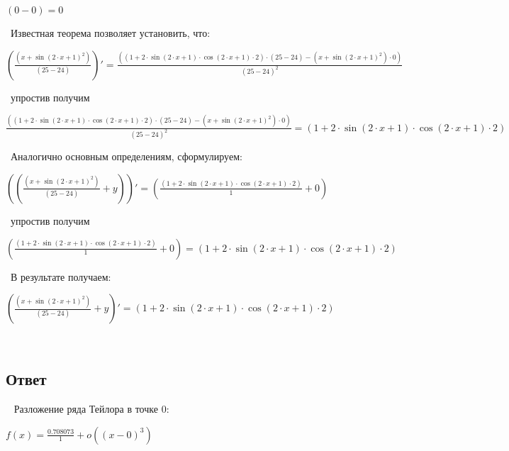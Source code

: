 \documentclass[a4paper,14pt]{extarticle}
\begin{document}
\begin{center}$(0-0) = 0$\end{center}\ 
Известная теорема позволяет установить, что: \\ 

\begin{center}$(\frac{(x+\sin  (2\cdot x+1)^{2})}{(25-24)})' = \frac{((1+2\cdot \sin  (2\cdot x+1)\cdot \cos  (2\cdot x+1)\cdot 2)\cdot (25-24)-(x+\sin  (2\cdot x+1)^{2})\cdot 0)}{(25-24)^{2}}$\end{center}\ 
упростив получим 

\begin{center}$\frac{((1+2\cdot \sin  (2\cdot x+1)\cdot \cos  (2\cdot x+1)\cdot 2)\cdot (25-24)-(x+\sin  (2\cdot x+1)^{2})\cdot 0)}{(25-24)^{2}} = (1+2\cdot \sin  (2\cdot x+1)\cdot \cos  (2\cdot x+1)\cdot 2)$\end{center}\ 
Аналогично основным определениям, сформулируем: \\ 

\begin{center}$((\frac{(x+\sin  (2\cdot x+1)^{2})}{(25-24)}+y))' = (\frac{(1+2\cdot \sin  (2\cdot x+1)\cdot \cos  (2\cdot x+1)\cdot 2)}{1}+0)$\end{center}\ 
упростив получим 

\begin{center}$(\frac{(1+2\cdot \sin  (2\cdot x+1)\cdot \cos  (2\cdot x+1)\cdot 2)}{1}+0) = (1+2\cdot \sin  (2\cdot x+1)\cdot \cos  (2\cdot x+1)\cdot 2)$\end{center}\ 
В результате получаем: \
\begin{center}$ (\frac{(x+\sin  (2\cdot x+1)^{2})}{(25-24)}+y)' = (1+2\cdot \sin  (2\cdot x+1)\cdot \cos  (2\cdot x+1)\cdot 2)$\end{center}\ 
\subsection{Ответ}\ \newline
Разложение ряда Тейлора в точке 0:\begin{center}
$f(x) = \frac{0.708073}{1} + o((x - 0)^3)$ \end{center}\ 
\end{document}
